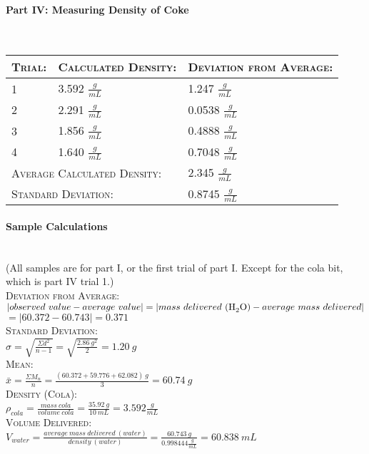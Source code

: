 \documentclass[11pt,letterpaper]{report}
\begin{document}
\paragraph{Part IV: Measuring Density of Coke}\mbox{}\\
\begin{tabularx}{\textwidth}{ | X| X| X|}
\hline
\textsc{Trial:} & \textsc{Calculated Density:} & \textsc{Deviation from Average:} \\
\hline
1 & 3.592 $\frac{g}{mL}$ & 1.247 $\frac{g}{mL}$\\
2 & 2.291 $\frac{g}{mL}$ & 0.0538 $\frac{g}{mL}$\\
3 & 1.856 $\frac{g}{mL}$ & 0.4888 $\frac{g}{mL}$\\
4 & 1.640 $\frac{g}{mL}$ & 0.7048 $\frac{g}{mL}$\\
\hline
\multicolumn{2}{|l|}{\textsc{Average Calculated Density:}} & 2.345 $\frac{g}{mL}$ \\
\hline
\multicolumn{2}{|l|}{\textsc{Standard Deviation:}} & 0.8745 $\frac{g}{mL}$ \\
\hline
\end{tabularx}

\paragraph{Sample Calculations}\mbox{}\\
(All samples are for part I, or the first trial of part I. Except for the cola bit, which is part IV trial 1.) \\[0.5cm]
\textsc{Deviation from Average:} \\
$|observed\ value - average\ value| = |mass\ delivered\ (\ce{H2O}) - average\ mass\ delivered| $ \\
$= |60.372 - 60.743| = 0.371$ \\[0.3cm]
\textsc{Standard Deviation:} \\
$\sigma = \sqrt{\frac{\Sigma d^2}{n-1}} = \sqrt{\frac{2.86\ g^2}{2}} = 1.20\ g$ \\[0.3cm]
\textsc{Mean:} \\
$\bar{x} = \frac{\Sigma M_n}{n} = \frac{(60.372 + 59.776 + 62.082)\ g}{3} = 60.74\ g$ \\[0.3cm]
\textsc{Density (Cola):} \\
$\rho_{cola} = \frac{mass\ cola}{volume\ cola} = \frac{35.92\ g}{10\ mL} = 3.592 \frac{g}{mL}$ \\[0.3cm]
\textsc{Volume Delivered:} \\
$V_{water} = \frac{average\ mass\ delivered\ (water)}{density\ (water)} = \frac{60.743\ g}{0.998444 \frac{g}{mL}} = 60.838\ mL$
\end{document}
